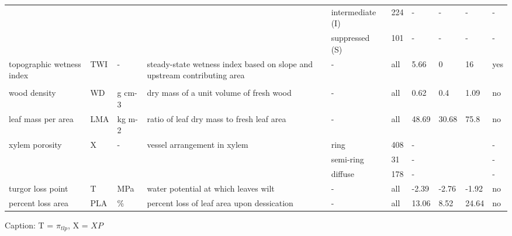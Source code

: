 \documentclass[]{article}
\begin{document}
\begin{table}[!h]
{\begin{tabular}{lll>{\raggedright\arraybackslash}p{7cm}llllll}
\hspace{1em}\hspace{1em} &  &  &  & intermediate (I) & 224 & - & - & - & -\\
\hspace{1em}\hspace{1em} &  &  &  & suppressed (S) & 101 & - & - & - & -\\
\hspace{1em}\hspace{1em}topographic wetness index & TWI & - & steady-state wetness index based on slope and upstream contributing area & - & all & 5.66 & 0 & 16 & yes\\
\addlinespace[.4em]
\multicolumn{1}{l}{\textit{species' traits}}\\
\hspace{1em}\hspace{1em}wood density & WD & g cm-3 & dry mass of a unit volume of fresh wood & - & all & 0.62 & 0.4 & 1.09 & no\\
\hspace{1em}\hspace{1em}leaf mass per area & LMA & kg m-2 & ratio of leaf dry mass to fresh leaf area & - & all & 48.69 & 30.68 & 75.8 & no\\
\hspace{1em}\hspace{1em}xylem porosity & X & - & vessel arrangement in xylem & ring & 408 & - &  &  & -\\
\hspace{1em}\hspace{1em} &  &  &  & semi-ring & 31 & - &  &  & -\\
\hspace{1em}\hspace{1em} &  &  &  & diffuse & 178 & - &  &  & -\\
\hspace{1em}\hspace{1em}turgor loss point & T & MPa & water potential at which leaves wilt & - & all & -2.39 & -2.76 & -1.92 & no\\
\hspace{1em}\hspace{1em}percent loss area & PLA & \% & percent loss of leaf area upon dessication & - & all & 13.06 & 8.52 & 24.64 & no\\
\bottomrule
\end{tabular}}
\end{table}

Caption: T = \(\pi_{tlp}\), X = \({XP}\)
\end{document}
